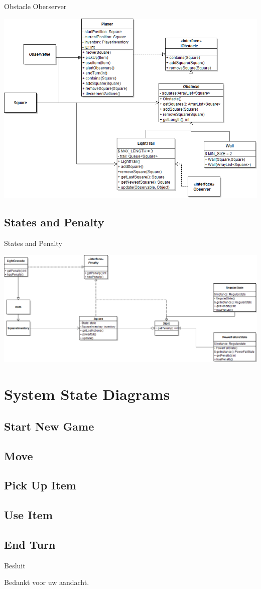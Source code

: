 \documentclass[t]{beamer}
\begin{document}
\begin{frame}{Obstacle Oberserver}
\begin{center}
\includegraphics[width=0.70\linewidth]{images/obstacleObserverClassDiagram}
\end{center}
\end{frame}

\subsection{States and Penalty}
\begin{frame}{States and Penalty}
\begin{center}
\includegraphics[width=0.90\linewidth]{images/classDiagramStateAndPanelty}
\end{center}
\end{frame}



\section{System State Diagrams}
\subsection{Start New Game}
\subsection{Move}
\subsection{Pick Up Item}
\subsection{Use Item}
\subsection{End Turn}




\begin{frame}{Besluit}
\vspace{0.8in}
\begin{center}
Bedankt voor uw aandacht.
\end{center}
\end{frame}
\end{document}
